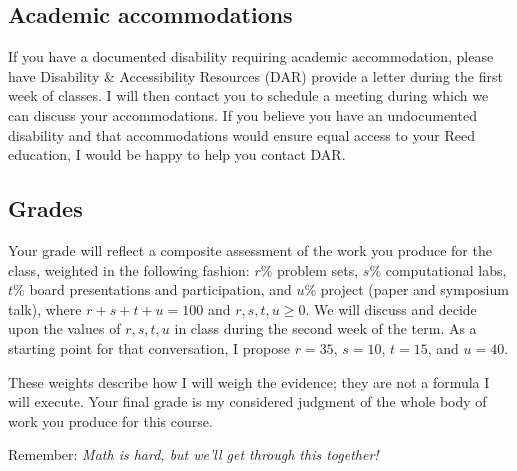 \documentclass[11pt,twoside]{amsart}
\begin{document}
\subsection*{Academic accommodations}
If you have a documented disability requiring academic accommodation, please have  Disability \& Accessibility Resources (DAR)  provide a letter during the first week of classes.  I will then contact you to schedule a meeting during which we can discuss your accommodations.  If you believe you have an undocumented disability and that accommodations would ensure equal access to your Reed education, I would be happy to help you contact DAR.

\subsection*{Grades}
Your grade will reflect a composite assessment of the work you produce for the class, weighted in the following fashion:  $r$\% problem sets, $s$\% computational labs, $t$\% board presentations and participation, and $u$\% project (paper and symposium talk), where $r+s+t+u = 100$ and $r,s,t,u\ge 0$. We will discuss and decide upon the values of $r,s,t,u$ in class during the second week of the term.  As a starting point for that conversation, I propose $r=35$, $s=10$, $t=15$, and $u=40$.

These weights describe how I will weigh the evidence; they are not a formula I will execute.  Your final grade is my considered judgment of the whole body of work you produce for this course.

\bigskip \bigskip

\begin{center}
Remember: \emph{Math is hard, but we'll get through this together!}
\end{center}
\end{document}
